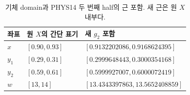 \begin{table}[H]\centering\footnotesize
\caption{기체 domain과 PHYS14 두 번째 half의 근 포함. 새 근은 원 $X$ 내부다.}
\label{tab:root}
\setlength{\tabcolsep}{4pt}
\begin{tabular}{@{}lll@{}}\toprule
좌표 & 원 $X$의 간단 표기 & 새 $g_2$ 포함\\\midrule
$x$ & $[0.90,0.93]$ & $[0.9132202086, 0.9168624395]$\\
$y_1$ & $[0.29,0.31]$ & $[0.2999648443, 0.3000354168]$\\
$y_2$ & $[0.59,0.61]$ & $[0.5999927007, 0.6000072419]$\\
$w$ & $[13,14]$ & $[13.4343397863, 13.5652408859]$\\
\bottomrule\end{tabular}
\end{table}
